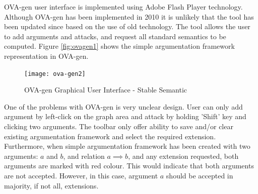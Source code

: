 OVA-gen user interface is implemented using Adobe Flash Player technology. Although OVA-gen has been implemented in 2010 it is unlikely that the tool has been updated since based on the use of old technology. The tool allows the user to add arguments and attacks, and request all standard semantics to be computed. Figure \ref{fig:ovagen1} shows the simple argumentation framework representation in OVA-gen.

\begin{figure}[h]
	\centering
	\texttt{[image: ova-gen2]}
	\caption{OVA-gen Graphical User Interface - Stable Semantic}
	\label{fig:ovagen2}
\end{figure}

One of the problems with OVA-gen is very unclear design. User can only add argument by left-click on the graph area and attack by holding 'Shift' key and clicking two arguments. The toolbar only offer ability to save and/or clear existing argumentation framework and select the required extension. Furthermore, when simple argumentation framework has been created with two arguments: $a$ and $b$, and relation $a \implies b$, and any extension requested, both arguments are marked with red colour. This would indicate that both arguments are not accepted. However, in this case, argument $a$ should be accepted in majority, if not all, extensions.